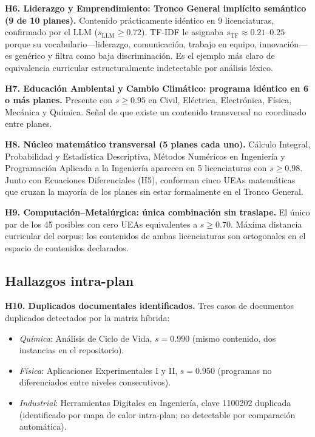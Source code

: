 \documentclass[11pt,a4paper]{article}
\begin{document}
\begin{hallazgo}
\textbf{H6. Liderazgo y Emprendimiento: Tronco General implícito semántico (9 de 10 planes).}
Contenido prácticamente idéntico en 9 licenciaturas, confirmado por el LLM ($s_{\mathrm{LLM}} \geq 0.72$).
TF-IDF le asignaba $s_{\mathrm{TF}} \approx 0.21$--$0.25$ porque su vocabulario---liderazgo, comunicación, trabajo en equipo, innovación---es genérico y filtra como baja discriminación.
Es el ejemplo más claro de equivalencia curricular estructuralmente indetectable por análisis léxico.
\end{hallazgo}

\begin{hallazgo}
\textbf{H7. Educación Ambiental y Cambio Climático: programa idéntico en 6 o más planes.}
Presente con $s \geq 0.95$ en Civil, Eléctrica, Electrónica, Física, Mecánica y Química.
Señal de que existe un contenido transversal no coordinado entre planes.
\end{hallazgo}

\begin{hallazgo}
\textbf{H8. Núcleo matemático transversal (5 planes cada uno).}
Cálculo Integral, Probabilidad y Estadística Descriptiva, Métodos Numéricos en Ingeniería y Programación Aplicada a la Ingeniería aparecen en 5 licenciaturas con $s \geq 0.98$.
Junto con Ecuaciones Diferenciales (H5), conforman cinco UEAs matemáticas que cruzan la mayoría de los planes sin estar formalmente en el Tronco General.
\end{hallazgo}

\begin{hallazgo}
\textbf{H9. Computación--Metalúrgica: única combinación sin traslape.}
El único par de los 45 posibles con cero UEAs equivalentes a $s \geq 0.70$.
Máxima distancia curricular del corpus: los contenidos de ambas licenciaturas son ortogonales en el espacio de contenidos declarados.
\end{hallazgo}

\subsection{Hallazgos intra-plan}

\begin{hallazgo}
\textbf{H10. Duplicados documentales identificados.}
Tres casos de documentos duplicados detectados por la matriz híbrida:
\begin{itemize}[nosep,leftmargin=1.5em]
  \item \textit{Química}: Análisis de Ciclo de Vida, $s = 0.990$
    (mismo contenido, dos instancias en el repositorio).
  \item \textit{Física}: Aplicaciones Experimentales I y II, $s = 0.950$
    (programas no diferenciados entre niveles consecutivos).
  \item \textit{Industrial}: Herramientas Digitales en Ingeniería, clave 1100202 duplicada
    (identificado por mapa de calor intra-plan; no detectable por comparación automática).
\end{itemize}
\end{hallazgo}
\end{document}
